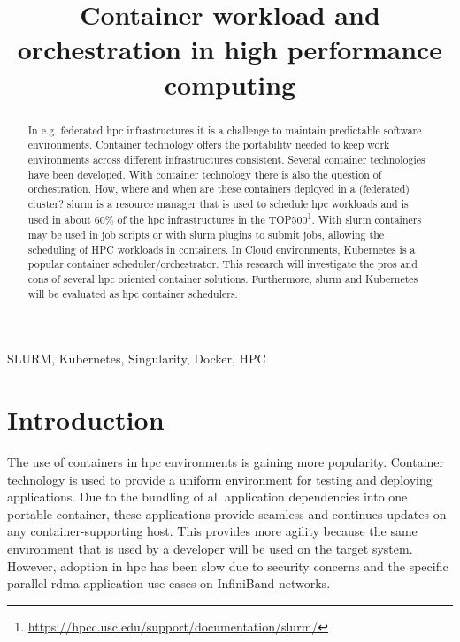 \documentclass[conference]{IEEEtran}
\begin{document}
\title{Container workload and orchestration in high performance computing}

\author{
}

\maketitle

\begin{abstract}
In e.g. federated \gls{hpc} infrastructures it is a challenge to maintain predictable software environments. Container technology offers the portability needed to keep work environments across different infrastructures consistent. Several container technologies have been developed. With container technology there is also the question of orchestration. How, where and when are these containers deployed in a  (federated) cluster? \gls{slurm} is a resource manager that is used to schedule \gls{hpc} workloads and is used in about 60\% of the \gls{hpc} infrastructures in the TOP500\footnote{\url{https://hpcc.usc.edu/support/documentation/slurm/}}. With \gls{slurm} containers may be used in job scripts or with \gls{slurm} plugins to submit jobs, allowing the scheduling of HPC workloads in containers. In Cloud environments, Kubernetes is a popular container scheduler/orchestrator. This research will investigate the pros and cons of several \gls{hpc} oriented container solutions. Furthermore, \gls{slurm} and Kubernetes will be evaluated as \gls{hpc} container schedulers.
\end{abstract}

\begin{IEEEkeywords}
SLURM, Kubernetes, Singularity, Docker, HPC
\end{IEEEkeywords}


\section{Introduction}
The use of containers in \gls{hpc} environments is gaining more popularity. Container technology is used to provide a uniform environment for testing and deploying applications. Due to the bundling of all application dependencies into one portable container, these applications provide seamless and continues updates on any container-supporting host. This provides more agility because the same environment that is used by a developer will be used on the target system. However, adoption in \gls{hpc} has been slow due to security concerns and the specific parallel \gls{rdma} application use cases on InfiniBand networks.
\end{document}
